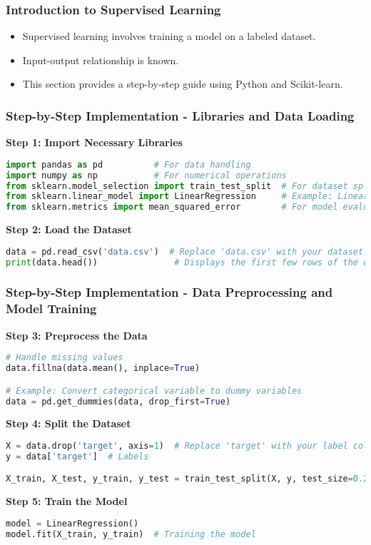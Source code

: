 \documentclass[aspectratio=169]{beamer}
\begin{document}
\begin{frame}[fragile]
    \frametitle{Introduction to Supervised Learning}
    \begin{itemize}
        \item Supervised learning involves training a model on a labeled dataset.
        \item Input-output relationship is known.
        \item This section provides a step-by-step guide using Python and Scikit-learn.
    \end{itemize}
\end{frame}

\begin{frame}[fragile]
    \frametitle{Step-by-Step Implementation - Libraries and Data Loading}
    \textbf{Step 1: Import Necessary Libraries}
    \begin{lstlisting}[language=Python]
import pandas as pd          # For data handling
import numpy as np           # For numerical operations
from sklearn.model_selection import train_test_split  # For dataset splitting
from sklearn.linear_model import LinearRegression     # Example: Linear Regression algorithm
from sklearn.metrics import mean_squared_error        # For model evaluation
    \end{lstlisting}

    \textbf{Step 2: Load the Dataset}
    \begin{lstlisting}[language=Python]
data = pd.read_csv('data.csv')  # Replace 'data.csv' with your dataset filename
print(data.head())               # Displays the first few rows of the dataset
    \end{lstlisting}
\end{frame}

\begin{frame}[fragile]
    \frametitle{Step-by-Step Implementation - Data Preprocessing and Model Training}
    \textbf{Step 3: Preprocess the Data}
    \begin{lstlisting}[language=Python]
# Handle missing values
data.fillna(data.mean(), inplace=True)

# Example: Convert categorical variable to dummy variables
data = pd.get_dummies(data, drop_first=True)
    \end{lstlisting}

    \textbf{Step 4: Split the Dataset}
    \begin{lstlisting}[language=Python]
X = data.drop('target', axis=1)  # Replace 'target' with your label column
y = data['target']  # Labels

X_train, X_test, y_train, y_test = train_test_split(X, y, test_size=0.2, random_state=42)
    \end{lstlisting}

    \textbf{Step 5: Train the Model}
    \begin{lstlisting}[language=Python]
model = LinearRegression()
model.fit(X_train, y_train)  # Training the model
    \end{lstlisting}
\end{frame}
\end{document}
